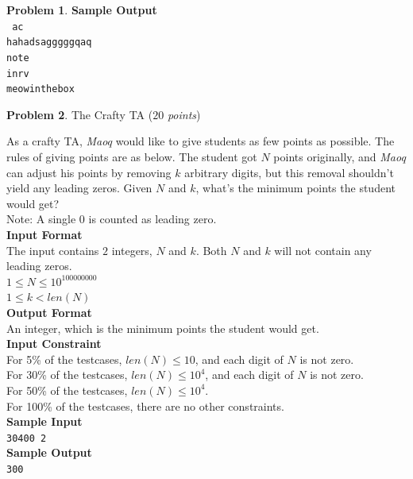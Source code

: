 \documentclass[12pt,a4paper]{report}
\newcommand{\points}[1]{ ($#1$ \textit{points}) }
\theoremstyle{definition}
\newtheorem{problem}{\textbf{Problem}}
\theoremstyle{definition}
\begin{document}
\begin{problem}
\textbf{\large Sample Output}\\
\texttt{
    ac\\
    hahadsagggggqaq\\
    note\\
    inrv\\
    meowinthebox\\
}
\end{problem}
\newpage

\begin{problem}The Crafty TA \points{20}

As a crafty TA, \textit{Maoq} would like to give students as few points as possible. The rules of giving points are as below.
The student got $N$ points originally, and \textit{Maoq} can adjust his points by removing $k$ arbitrary digits, but this removal shouldn't yield any leading zeros. Given $N$ and $k$, what's the minimum points the student would get?\\
Note: A single \(0\) is counted as leading zero.\\

\textbf{\large Input Format}\\
The input contains $2$ integers, $N$ and $k$. Both $N$ and $k$ will not contain any leading zeros.\\
$1\leq N\leq 10^{100000000}$\\
$1\leq k<len(N)$\\

\textbf{\large Output Format}\\
An integer, which is the minimum points the student would get.\\

\textbf{\large Input Constraint}\\
For 5\% of the testcases, $len(N)\leq 10$, and each digit of $N$ is not zero.\\
For 30\% of the testcases, $len(N)\leq 10^4$, and each digit of $N$ is not zero.\\
For 50\% of the testcases, $len(N)\leq 10^4$.\\
For 100\% of the testcases, there are no other constraints.\\

\textbf{\large Sample Input}\\
\texttt{30400 2}\\

\textbf{\large Sample Output}\\
\texttt{300}\\
\end{problem}
\end{document}
